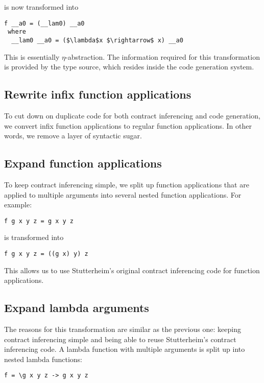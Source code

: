 \documentclass[10pt]{report}
\begin{document}
is now transformed into

\begin{lstlisting}[mathescape, caption=Result of $\eta$-abstraction transformation.]
f __a0 = (__lam0) __a0                
 where                    
  __lam0 __a0 = ($\lambda$x $\rightarrow$ x) __a0
\end{lstlisting}

This is essentially $\eta$-abstraction.
The information required for this transformation is provided by the type source,  which resides inside the code generation system.

\subsection{Rewrite infix function applications}
To cut down on duplicate code for both contract inferencing and code generation, we convert infix function applications to regular function applications.
In other words, we remove a layer of syntactic sugar.

\subsection{Expand function applications}
To keep contract inferencing simple, we split up function applications that are applied to multiple arguments into several nested function applications.
For example:

\begin{lstlisting}
f g x y z = g x y z
\end{lstlisting}

is transformed into

\begin{lstlisting}[caption=Result of function application expansion transformation.]
f g x y z = ((g x) y) z
\end{lstlisting}

This allows us to use Stutterheim's original contract inferencing code for function applications.

\subsection{Expand lambda arguments}
The reasons for this transformation are similar as the previous one: keeping contract inferencing simple and being able to reuse Stutterheim's contract inferencing code.
A lambda function with multiple arguments is split up into nested lambda functions:

\begin{lstlisting}
f = \g x y z -> g x y z
\end{lstlisting}
\end{document}
